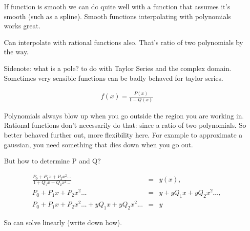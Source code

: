 \documentclass[12pt]{article}
\begin{document}
If function is smooth we can do quite well with a function that assumes it's smooth (such as a spline).
Smooth functions interpolating with polynomials works great.


Can interpolate with rational functions also. That's ratio of two polynomials by the way.

Sidenote: what is a pole?  to do with Taylor Series and the complex domain. 
Sometimes very sensible functions can be badly behaved for taylor series. 

\begin{eqnarray}
    f(x) = \frac{P(x)}{1+Q(x)}
\end{eqnarray}

Polynomials always blow up when you go outside the region you are working in.
Rational functions don't necessarily do that: since a ratio of two polynomials. 
So better behaved further out, more flexibility here.
For example to approximate a gaussian, you need something that dies down when you go out.

But how to determine P and Q? 

\begin{eqnarray}
    \frac{P_0 + P_1 x + P_2 x^2 ...}{1 + Q_1 x + Q_2 x^2 ... } &=& y(x), \\\nonumber
    P_0 + P_1 x + P_2 x^2 ... &=& y + y Q_1 x + y Q_2 x^2 ... , \\\nonumber
    P_0 + P_1 x + P_2 x^2 ... + y Q_1 x + y Q_2 x^2 ... &=& y 
\end{eqnarray}

So can solve linearly (write down how).
\end{document}
